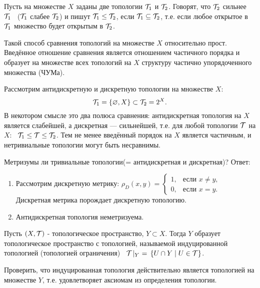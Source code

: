 \begin{definition}
    Пусть на множестве $X$ заданы две топологии $\mathcal{T}_1$ и $\mathcal{T}_2$. Говорят, что $\mathcal{T}_2$ сильнее $\mathcal{T}_1$ \ ($\mathcal{T}_1$ слабее $\mathcal{T}_2$) и пишут $\mathcal{T}_1 \leq \mathcal{T}_2$, если $\mathcal{T}_1 \subseteq \mathcal{T}_2$, т.е. если любое открытое в $\mathcal{T}_1$ множество будет открытым в $\mathcal{T}_2$.
\end{definition}
Такой способ сравнения топологий на множестве $X$ относительно прост. Введённое отношение сравнения является отношением частичного порядка и образует на множестве всех топологий на $X$ структуру частично упорядоченного множества (ЧУМа).

\begin{example}
    Рассмотрим антидискретную и дискретную топологии на множестве $X$: 
    \[
        \mathcal{T}_1 = \left\{\varnothing, X\right\} \subset \mathcal{T}_2 = 2^{X}.
    \]
    В некотором смысле это два полюса сравнения: антидискретная топология на $X$ является слабейшей, а дискретная --- сильнейшей, т.е. для любой топологии $\mathcal{T}$ на $X$: \, $\mathcal{T}_1 \leq \mathcal{T} \leq \mathcal{T}_2$. Тем не менее введённый порядок на $X$ является частичным, и нетривиальные топологии могут быть несравнимы.
\end{example}

\begin{exercise}
    Метризумы ли тривиальные топологии(= антидискретная и дискретная)?
    Ответ:
    \begin{enumerate}
        \item Рассмотрим дискретную метрику: $\rho_{D}(x, y) =
        \begin{cases}
            1, &\text{если $x \neq y$,} \\
            0, &\text{если $x = y$.}
        \end{cases} $
        Дискретная метрика порождает дискретную топологию.
        \item Антидискретная топология неметризуема.
    \end{enumerate}
\end{exercise}

\begin{definition}
    Пусть $(X, \mathcal{T})$ - топологическое пространство, $Y \subset X$. Тогда $Y$ образует топологическое пространство с топологией, называемой индуцированной топологией (топологией ограничения) \ $\mathcal{T}\!\mid_{Y} \ = \, \left\{U \cap Y \mid U \in \mathcal{T}\right\}$.
\end{definition}
\begin{exercise}
    Проверить, что индуцированная топология действительно является топологией на множестве $Y$, т.е. удовлетворяет аксиомам из определения топологии.
\end{exercise}

